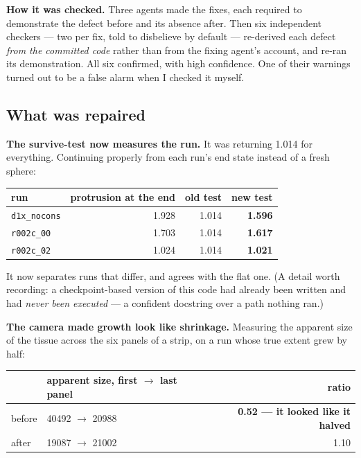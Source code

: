 \documentclass[11pt,a4paper]{article}
\newcommand{\code}[1]{\texttt{#1}}
\begin{document}
\textbf{How it was checked.} Three agents made the fixes, each required to demonstrate the defect
before and its absence after. Then six independent checkers --- two per fix, told to disbelieve by
default --- re-derived each defect \emph{from the committed code} rather than from the fixing
agent's account, and re-ran its demonstration. All six confirmed, with high confidence. One of
their warnings turned out to be a false alarm when I checked it myself.

\subsection{What was repaired}

\textbf{The survive-test now measures the run.} It was returning 1.014 for everything. Continuing
properly from each run's end state instead of a fresh sphere:

\begin{center}\small
\begin{tabular}{@{}l r r r@{}}
\toprule
run & protrusion at the end & old test & \textbf{new test}\\
\midrule
\code{d1x\_nocons} & 1.928 & 1.014 & \textbf{1.596}\\
\code{r002c\_00}   & 1.703 & 1.014 & \textbf{1.617}\\
\code{r002c\_02}   & 1.024 & 1.014 & \textbf{1.021}\\
\bottomrule
\end{tabular}
\end{center}

It now separates runs that differ, and agrees with the flat one. (A detail worth recording: a
checkpoint-based version of this code had already been written and had \emph{never been
executed} --- a confident docstring over a path nothing ran.)

\textbf{The camera made growth look like shrinkage.} Measuring the apparent size of the tissue
across the six panels of a strip, on a run whose true extent grew by half:

\begin{center}\small
\begin{tabular}{@{}l l r@{}}
\toprule
& apparent size, first $\to$ last panel & ratio\\
\midrule
before & 40492 $\to$ 20988 & \textbf{0.52 --- it looked like it halved}\\
after  & 19087 $\to$ 21002 & 1.10\\
\bottomrule
\end{tabular}
\end{center}
\end{document}
